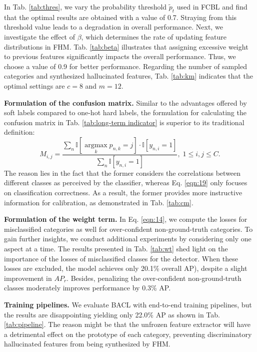 \documentclass[lettersize,journal]{IEEEtran}
\begin{document}
In Tab. \ref{tab:thres}, we vary the probability threshold $\tilde{p}_t$ used in FCBL and find that the optimal results are obtained with a value of 0.7.
Straying from this threshold value leads to a degradation in overall performance.
Next, we investigate the effect of $\beta$, which determines the rate of updating feature distributions in FHM.
Tab. \ref{tab:beta} illustrates that assigning excessive weight to previous features significantly impacts the overall performance. 
Thus, we choose a value of 0.9 for better performance.
Regarding the number of sampled categories and synthesized hallucinated features, Tab. \ref{tab:km} indicates that the optimal settings are $c=8$ and $m=12$.

\noindent\textbf{Formulation of the confusion matrix.}
Similar to the advantages offered by soft labels compared to one-hot hard labels, the formulation for calculating the confusion matrix in Tab. \ref{tab:long-term indicator} is superior to its 
traditional definition:
\begin{equation}\label{eqn:19}
    M_{i,j} = \frac{\sum\limits_n \mathbb{I}[\mathop{\mathrm{argmax}}\limits_k p_{n,k}=j]\cdot\mathbb{I}[y_{n,i}=1]}{\sum\limits_n \mathbb{I}[y_{n,i}=1]},\; 1\le i,j\le C.
\end{equation}
The reason lies in the fact that the former considers the correlations between different classes as perceived by the classifier, whereas Eq. \eqref{eqn:19} only focuses on classification correctness.
As a result, the former provides more instructive information for calibration, as demonstrated in Tab. \ref{tab:cm}.

\noindent\textbf{Formulation of the weight term.}
In Eq. \eqref{eqn:14}, we compute the losses for misclassified categories as well for over-confident non-ground-truth categories.
To gain further insights, we conduct additional experiments by considering only one aspect at a time.
The results presented in Tab. \ref{tab:wt} shed light on the importance of the losses of misclassified classes for the detector.
When these losses are excluded, the model achieves only 20.1\% overall AP), despite a slight improvement in $AP_r$.
Besides, penalizing the over-confident non-ground-truth classes moderately improves performance by 0.3\% AP.

\noindent\textbf{Training pipelines.}
We evaluate BACL with end-to-end training pipelines, but the results are disappointing yielding only 22.0\% AP as shown in Tab. \ref{tab:pipeline}.
The reason might be that the unfrozen feature extractor will have a detrimental effect on the prototype of each category, preventing discriminatory hallucinated features from being synthesized by FHM.
\end{document}
